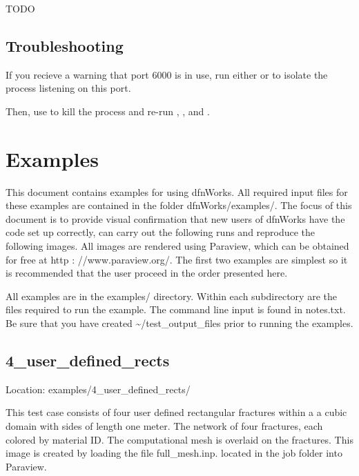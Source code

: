 \documentclass[letterpaper,10pt,english]{sphinxmanual}
\begin{document}

%
\begin{sphinxVerbatim}[commandchars=\\\{\}]
TODO
\end{sphinxVerbatim}


\section{Troubleshooting}
\label{\detokenize{setup:troubleshooting}}
If you recieve a warning that port 6000 is in use, run either 
or  to isolate the process listening on this port.

Then, use  to kill the process and re-run , ,
and .


\chapter{Examples}
\label{\detokenize{examples:examples}}\label{\detokenize{examples::doc}}
This document contains examples for using dfnWorks. All required input files for these examples are contained in the folder dfnWorks/examples/. The focus of this document is to provide visual confirmation that new users of dfnWorks have the code set up correctly, can carry out the following runs and reproduce the following images. All images are rendered using Paraview, which can be obtained for free at http : //www.paraview.org/. The first two examples are simplest so it is recommended that the user proceed in the order presented here.

All examples are in the examples/ directory. Within each subdirectory are the files required to run the example. The command line input is found in notes.txt. Be sure that you have created \textasciitilde{}/test\_output\_files prior to running the examples.


\section{4\_user\_defined\_rects}
\label{\detokenize{examples:user-defined-rects}}
Location: examples/4\_user\_defined\_rects/

This test case consists of four user defined rectangular fractures within a a cubic domain with sides of length one meter. The network of four fractures, each colored by material ID. The computational mesh is overlaid on the fractures. This image is created by loading the file full\_mesh.inp. located in the job folder into Paraview.
\end{document}
